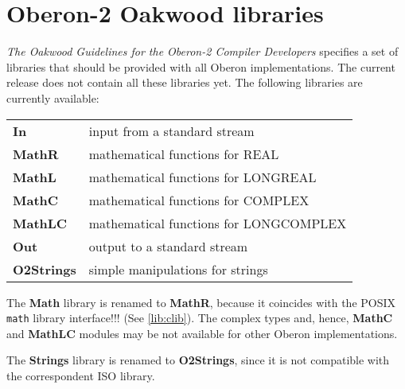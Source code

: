 \chapter{Oberon-2 Oakwood libraries}\label{lib:oak}

{\em The Oakwood Guidelines for the Oberon-2 Compiler Developers}
specifies a set of libraries that should be provided with all Oberon
implementations. The current \xds{} release does not contain all these
libraries yet. The following libraries are currently available:
\begin{flushleft}
\begin{tabular}{ll}
\bf In        & input from a standard stream   \\
\bf MathR     & mathematical functions for REAL  \\
\bf MathL     & mathematical functions for LONGREAL  \\
\bf MathC     & mathematical functions for COMPLEX  \\
\bf MathLC    & mathematical functions for LONGCOMPLEX  \\
\bf Out       & output to a standard stream    \\
\bf O2Strings & simple manipulations for strings    \\
\end{tabular}
\end{flushleft}

The {\bf Math} library is renamed to {\bf MathR}, because it
coincides with the POSIX {\tt math} library
interface\ifcomment !!! (See \ref{lib:clib})\fi.
The complex types and, hence, {\bf MathC} and
{\bf MathLC} modules may be not available for other Oberon
implementations.

The {\bf Strings} library is renamed to {\bf O2Strings}, since
it is not compatible with the correspondent ISO library.

